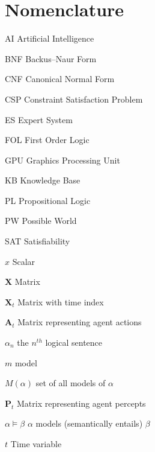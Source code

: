 \chapter{Nomenclature}

\begin{Nomencl}[4em]
	
	\item[AI] Artificial Intelligence
	\item[BNF] Backus–Naur Form  
	\item[CNF] Canonical Normal Form
	\item[CSP] Constraint Satisfaction Problem
	\item[ES] Expert System 	
	\item[FOL] First Order Logic
	\item[GPU] Graphics Processing Unit    
    \item[KB] Knowledge Base
    \item[PL] Propositional Logic
    \item[PW] Possible World
    \item[SAT] Satisfiability
    
   
	\item[$x$] Scalar
	\item[$\mathbf{X}$] Matrix
   	\item[$\mathbf{X}_t$] Matrix with time index 



   
   \item[$\mathbf{A}_t$] Matrix representing agent actions 
   
   	\item[$\alpha_n$]  the $n^{th}$ logical sentence
   	\item[$m$]  model
   	\item[$M(\alpha)$]  set of all models of $\alpha$
	\item[$\mathbf{P}_t$] Matrix representing agent percepts   
   	\item[$\alpha \models \beta$]  $\alpha$ models (semantically entails) $\beta$
   	\item[$t$] Time variable



\end{Nomencl}


\endinput
